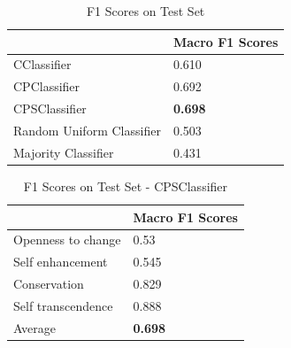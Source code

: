 \documentclass[11pt]{article}
\begin{document}
\begin{table}[H]
\centering
\captionsetup{justification=centering, singlelinecheck=false}
\caption{F1 Scores on Test Set}
\footnotesize
\begin{tabular}{|l|l|}
\hline
                                             & Macro F1 Scores \\ \hline
CClassifier                     & 0.610                  \\ \hline
CPClassifier                           & 0.692                   \\ \hline
CPSClassifier                     & \textbf{0.698}                  \\ \hline
Random Uniform Classifier                    & 0.503                  \\ \hline
Majority Classifier                    & 0.431                   \\ \hline
\end{tabular}
\label{Tab:Tcr_2}
\end{table}


\begin{table}[H]
\centering
\captionsetup{justification=centering, singlelinecheck=false}
\caption{F1 Scores on Test Set - CPSClassifier}
\footnotesize
\begin{tabular}{|l|l|}
\hline
                                            & Macro F1 Scores \\ \hline
Openness to change                     & 0.53                  \\ \hline
Self enhancement                         & 0.545                   \\ \hline
Conservation                     & 0.829                 \\ \hline
Self transcendence                     & 0.888                \\ \hline
Average                    & \textbf{0.698 }                  \\ \hline
\end{tabular}
\label{Tab:Tcr_3}
\end{table}
\end{document}
